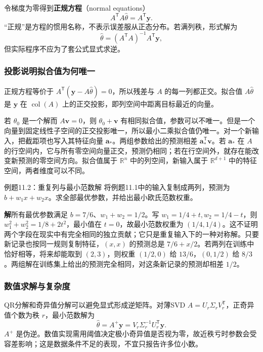 \documentclass[UTF8,fontset=none,zihao=-4,a4paper]{ctexart}
\newcommand{\term}[1]{\textbf{#1}}
\newcommand{\sol}{\par\noindent\textbf{解}\quad}
\numberwithin{equation}{section}
\numberwithin{figure}{section}
\begin{document}
令梯度为零得到\term{正规方程}（normal equations）
\begin{equation}
 A^{\mathsf T}A\widehat\theta=A^{\mathsf T}\symbf y.
\end{equation}
“正规”是方程的惯用名称，不表示误差服从正态分布。若满列秩，形式解为
\[
 \widehat\theta=(A^{\mathsf T}A)^{-1}A^{\mathsf T}\symbf y,
\]
但实际程序不应为了套公式显式求逆。

\subsubsection{投影说明拟合值为何唯一}
正规方程等价于 $A^{\mathsf T}(\symbf y-A\widehat\theta)=0$，所以残差与 $A$ 的每一列都正交。拟合值 $A\widehat\theta$ 是 $\symbf y$ 在 $\operatorname{col}(A)$ 上的正交投影，即列空间中距离目标最近的向量。

若 $\theta_0$ 是一个解而 $A\symbf v=0$，则 $\theta_0+\symbf v$ 有相同拟合值，参数可以不唯一。但是一个向量到固定线性子空间的正交投影唯一，所以最小二乘拟合值仍唯一。对一个新输入，把截距项也写入其特征向量 $\symbf a_*$。两组参数给出的预测相差 $\symbf a_*^{\mathsf T}\symbf v$。若 $\symbf a_*$ 在 $A$ 的行空间内，它与所有零空间向量正交，预测仍相同；若在行空间外，就存在能改变新预测的零空间方向。拟合值属于 $\mathbb R^n$ 中的列空间，新输入属于 $\mathbb R^{d+1}$ 中的特征空间，两者维度可以不同。

\begin{infobox}{例题11.2：重复列与最小范数解}
将例题11.1中的输入复制成两列，预测为 $b+w_1x+w_2x$。求全部最优参数，并给出最小欧氏范数权重。
\end{infobox}
\sol 所有最优参数满足 $b=7/6$、$w_1+w_2=1/2$。写 $w_1=1/4+t,w_2=1/4-t$，则 $w_1^2+w_2^2=1/8+2t^2$，最小值在 $t=0$，故最小范数权重为 $(1/4,1/4)$。这不证明两个字段在现实中有完全相同的独立贡献；它只是重复输入下的一种对称解。只要新记录也按同一规则复制特征，$(x,x)$ 的预测总是 $7/6+x/2$。若两列在训练中恰好相等，将来却能取到 $(2,3)$，则权重 $(1/2,0)$ 给 $13/6$，$(0,1/2)$ 给 $8/3$。两组解在训练集上给出的预测完全相同，对这条新记录的预测却相差 $1/2$。

\subsubsection{数值求解与复杂度}
QR分解和奇异值分解可以避免显式形成逆矩阵。对薄SVD $A=U_r\Sigma_rV_r^{\mathsf T}$，正奇异值个数为秩 $r$，最小范数解为
\[
 \widehat\theta=A^+\symbf y=V_r\Sigma_r^{-1}U_r^{\mathsf T}\symbf y.
\]
$A^+$ 是伪逆。数值实现需用阈值决定极小奇异值是否视为零，故近秩亏时参数会受容差影响；这是数据条件不足的表现，不宜只报告许多位小数。
\end{document}
